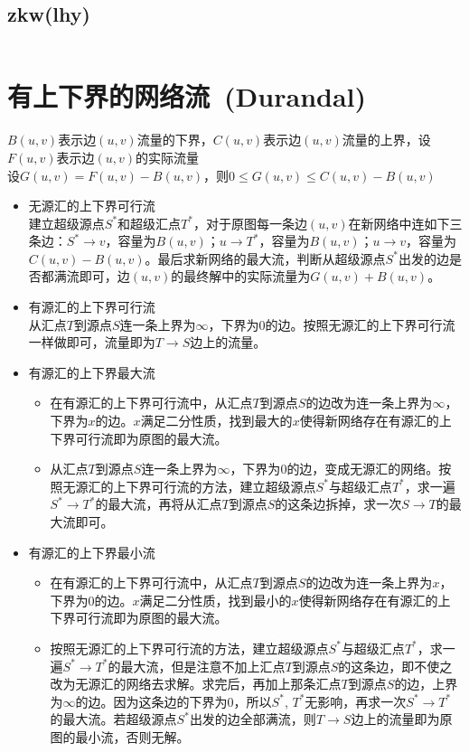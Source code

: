 	\subsection*{zkw(lhy)}
		\inputminted{cpp}{GraphTheory/zkw_min_cost_flow.cpp}
\section{有上下界的网络流\ \small(Durandal)}
	$ B(u, v) $表示边$ (u, v) $流量的下界，$ C(u, v) $表示边$ (u, v) $流量的上界，设$ F(u, v) $表示边$ (u, v) $的实际流量\\
	设$ G(u, v) = F(u, v) - B(u, v) $，则$ 0 \leq G(u, v) \leq C(u, v) - B(u, v) $
	\begin{itemize}
		\item 无源汇的上下界可行流
			\\建立超级源点$ S^\ast $和超级汇点$ T^\ast $，对于原图每一条边$ (u, v) $在新网络中连如下三条边：$ S^\ast \to v $，容量为$ B(u, v) $；$ u \to T^\ast $，容量为$ B(u, v) $；$ u \to v $，容量为$ C(u, v) - B(u, v) $。最后求新网络的最大流，判断从超级源点$ S^\ast $出发的边是否都满流即可，边$ (u, v) $的最终解中的实际流量为$ G(u, v) + B(u, v) $。
		\item 有源汇的上下界可行流
			\\从汇点$ T $到源点$ S $连一条上界为$ \infty $，下界为$ 0 $的边。按照无源汇的上下界可行流一样做即可，流量即为$ T \to S $边上的流量。
		\item 有源汇的上下界最大流
			\begin{itemize}
				\item 在有源汇的上下界可行流中，从汇点$ T $到源点$ S $的边改为连一条上界为$ \infty $，下界为$ x $的边。$ x $满足二分性质，找到最大的$ x $使得新网络存在有源汇的上下界可行流即为原图的最大流。
				\item 从汇点$ T $到源点$ S $连一条上界为$ \infty $，下界为$ 0 $的边，变成无源汇的网络。按照无源汇的上下界可行流的方法，建立超级源点$ S^\ast $与超级汇点$ T^\ast $，求一遍$ S^\ast \to T^\ast $的最大流，再将从汇点$ T $到源点$ S $的这条边拆掉，求一次$ S \to T $的最大流即可。
			\end{itemize}
		\item 有源汇的上下界最小流
			\begin{itemize}
				\item 在有源汇的上下界可行流中，从汇点$ T $到源点$ S $的边改为连一条上界为$ x $，下界为$ 0 $的边。$ x $满足二分性质，找到最小的$ x $使得新网络存在有源汇的上下界可行流即为原图的最大流。
				\item 按照无源汇的上下界可行流的方法，建立超级源点$ S^\ast $与超级汇点$ T^\ast $，求一遍$ S^\ast \to T^\ast $的最大流，但是注意不加上汇点$ T $到源点$ S $的这条边，即不使之改为无源汇的网络去求解。求完后，再加上那条汇点$ T $到源点$ S $的边，上界为$ \infty $的边。因为这条边的下界为$ 0 $，所以$ S^\ast $, $ T^\ast $无影响，再求一次$ S^\ast \to T^\ast $的最大流。若超级源点$ S^\ast $出发的边全部满流，则$ T \to S $边上的流量即为原图的最小流，否则无解。
			\end{itemize}
	\end{itemize}
